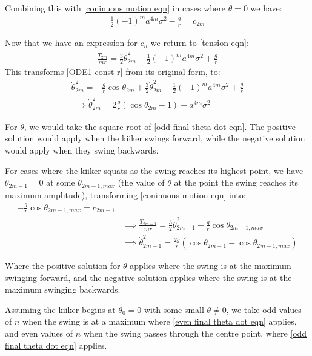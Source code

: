 \documentclass[12pt]{article}
\begin{document}
Combining this with \ref{coninuous motion eqn} in cases where $\theta = 0$ we have:
\begin{align}
    \frac{1}{2}(-1)^{m}a^{4m}\sigma^2 - \frac{g}{r} = c_{2m}
\end{align}

Now that we have an expression for $c_n$ we return to \ref{tension eqn}:
\begin{align}
    \frac{T_{2m}}{mr} = \frac{3}{2}\dot{\theta}_{2m}^2 - \frac{1}{2}(-1)^{m}a^{4m}\sigma^2 + \frac{g}{r}
\end{align}
This transforms \ref{ODE1 const r} from its original form, to:
\begin{align}
    \dot{\theta}_{2m}^2 = -\frac{g}{r}\cos{\theta_{2m}} + \frac{3}{2}\dot{\theta}_{2m}^2 - \frac{1}{2}(-1)^{m}a^{4m}\sigma^2 + \frac{g}{r}
    \\\implies\dot{\theta}_{2m}^2 = 2\frac{g}{r}(\cos{\theta}_{2m}-1) +a^{4m}\sigma^2 
    \label{odd final theta dot eqn}
\end{align}

For $\theta$, we would take the square-root of \ref{odd final theta dot eqn}. The positive solution would apply when the kiiker swings forward, while the negative solution would apply when they swing backwards.

For cases where the kiiker squats as the swing reaches its highest point, we have $\dot{\theta}_{2m-1} = 0$ at some $\theta_{2m-1,max}$ (the value of $\theta$ at the point the swing reaches its maximum amplitude), transforming \ref{coninuous motion eqn} into:
\begin{align}
    -\frac{g}{r}\cos{\theta_{2m-1,max}} = c_{2m-1}
    \\&\implies \frac{T_{2m-1}}{mr} = \frac{3}{2}\dot{\theta}_{2m-1}^2 + \frac{g}{r}\cos{\theta_{2m-1,max}}
    \\&\implies \dot{\theta}_{2m-1}^2 = \frac{2g}{r}(\cos{\theta_{2m-1}}-\cos{\theta_{2m-1,max}})
    \label{even final theta dot eqn}
\end{align}

Where the positive solution for $\dot{\theta}$ applies where the swing is at the maximum swinging forward, and the negative solution applies where the swing is at the maximum swinging backwards.

Assuming the kiiker begins at $\theta_0 = 0$ with some small $\dot{\theta} \neq 0$, we take odd values of $n$ when the swing is at a maximum where \ref{even final theta dot eqn} applies, and even values of $n$ when the swing passes through the centre point, where \ref{odd final theta dot eqn} applies.
\end{document}
